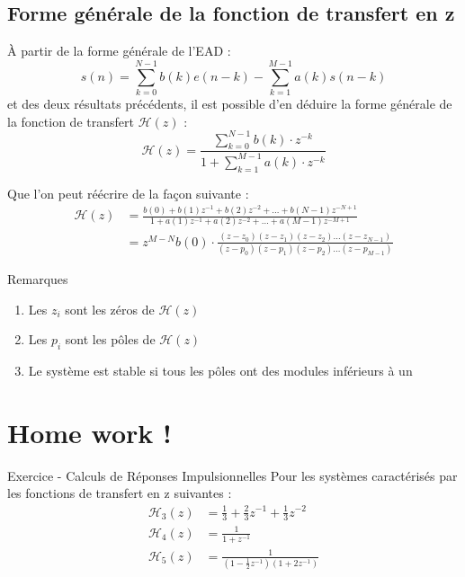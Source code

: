 \documentclass[a4paper,11pt]{beamer}
\newcounter{exampleBlockCounter}
\begin{document}
\subsection{Forme générale de la fonction de transfert en z}
\begin{frame}
\justifying
À partir de la forme générale de l'EAD :
$$
s(n) = \sum_{k=0}^{N-1}b(k)e(n-k) - \sum_{k=1}^{M-1}a(k)s(n-k)
$$
et des deux résultats précédents, il est possible d'en déduire la forme générale
de la fonction de transfert $\mathcal{H}(z)$ :
$$
\boxed{
\mathcal{H}(z) = \frac{\sum\limits_{k=0}^{N-1}b(k)\cdot
z^{-k}}{1+\sum\limits_{k=1}^{M-1}a(k)\cdot z^{-k}}
}
$$
\end{frame} 
 
\begin{frame}
\justifying
Que l'on peut réécrire de la façon suivante :
$$
\begin{aligned}
\mathcal{H}(z) &= \frac{b(0) + b(1)z^{-1} + b(2)z^{-2} + \ldots +
b(N-1)z^{-N+1}}{1 + a(1)z^{-1} + a(2)z^{-2} + \ldots + a(M-1)z^{-M+1}}\\
&= z^{M-N}b(0)\cdot \frac{(z-z_0)(z-z_1)(z-z_2)\ldots
(z-z_{N-1})}{(z-p_0)(z-p_1)(z-p_2)\ldots (z-p_{M-1})}
\end{aligned}
$$
\pause
\begin{alertblock}{Remarques}
\begin{enumerate}
  \justifying
  \item Les $z_i$ sont les zéros de $\mathcal{H}(z)$
  \item Les $p_i$ sont les pôles de $\mathcal{H}(z)$
  \item Le système est stable si tous les pôles ont des modules inférieurs à un
\end{enumerate}
\end{alertblock}
\end{frame}
 
\section{Home work !}  
\begin{frame}
\begin{exampleblock}{Exercice  - Calculs de Réponses
Impulsionnelles} 
\justifying
Pour les systèmes caractérisés par les fonctions de transfert
en z suivantes :
$$
\begin{aligned}
\mathcal{H}_3(z) &= \frac{1}{3} + \frac{2}{3}z^{-1} + \frac{1}{3}z^{-2}\\
\mathcal{H}_4(z) &= \frac{1}{1+z^{-1}}\\
\mathcal{H}_5(z) &= \frac{1}{(1-\frac{1}{2}z^{-1})(1+2z^{-1})}
\end{aligned}
$$
\end{exampleblock}
\end{frame}
\end{document}
